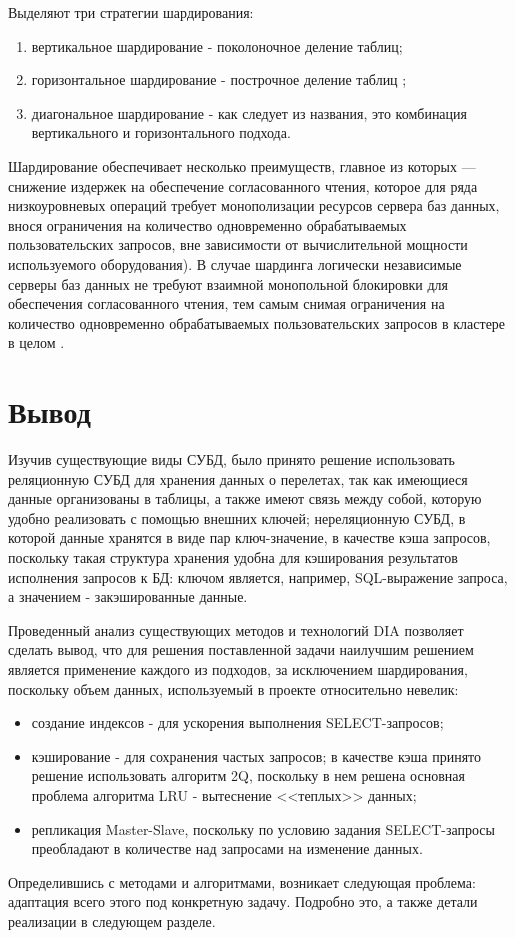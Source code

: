 Выделяют три стратегии шардирования:
\begin{enumerate}
	\item вертикальное шардирование - поколоночное деление таблиц;
	\item горизонтальное шардирование - построчное деление таблиц ;
	\item диагональное шардирование - как следует из названия, это комбинация вертикального и горизонтального подхода.
\end{enumerate}

Шардирование обеспечивает несколько преимуществ, главное из которых — снижение издержек на обеспечение согласованного чтения, которое для ряда низкоуровневых операций требует монополизации ресурсов сервера баз данных, внося ограничения на количество одновременно обрабатываемых пользовательских запросов, вне зависимости от вычислительной мощности используемого оборудования). В случае шардинга логически независимые серверы баз данных не требуют взаимной монопольной блокировки для обеспечения согласованного чтения, тем самым снимая ограничения на количество одновременно обрабатываемых пользовательских запросов в кластере в целом \cite{sharding}. 


\section*{Вывод}

Изучив существующие виды СУБД, было принято решение использовать реляционную СУБД для хранения данных о перелетах, так как имеющиеся данные организованы в таблицы, а также имеют связь между собой, которую удобно реализовать с помощью внешних ключей; нереляционную СУБД, в которой данные хранятся в виде пар ключ-значение, в качестве кэша  запросов, поскольку такая структура хранения удобна для кэширования результатов исполнения запросов к БД: ключом является, например, SQL-выражение запроса, а значением - закэшированные данные.

Проведенный анализ существующих методов и технологий DIA позволяет сделать вывод, что для решения поставленной задачи наилучшим решением является применение каждого из подходов, за исключением шардирования, поскольку объем данных, используемый в проекте относительно невелик:
\begin{itemize}
	\item создание индексов - для ускорения выполнения SELECT-запросов;
	\item кэширование - для сохранения частых запросов; в качестве кэша принято решение использовать алгоритм 2Q, поскольку в нем решена основная проблема алгоритма LRU - вытеснение <<теплых>> данных;
	\item репликация Master-Slave, поскольку по условию задания SELECT-запросы преобладают в количестве над запросами на изменение данных.
\end{itemize}

Определившись с методами и алгоритмами, возникает следующая проблема: адаптация всего этого под конкретную задачу. Подробно это, а также детали реализации в следующем разделе.


















